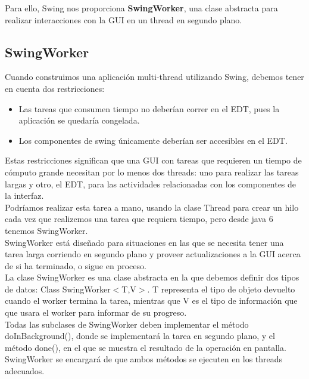 \documentclass[12pt, a4paper]{book}
\begin{document}
Para ello, Swing nos proporciona \textbf{SwingWorker}, una clase abstracta para realizar interacciones con la \gls{GUI} en un thread en segundo plano.

\subsection{SwingWorker}

Cuando construimos una aplicación multi-thread utilizando Swing, debemos tener en cuenta dos restricciones:

\begin{itemize}
	\item Las tareas que consumen tiempo no deberían correr en el \gls{EDT}, pues la aplicación se quedaría congelada.
	\item Los componentes de swing únicamente deberían ser accesibles en el \gls{EDT}.
\end{itemize}

Estas restricciones significan que una \gls{GUI} con tareas que requieren un tiempo de cómputo grande necesitan por lo menos dos threads: uno para realizar las tareas largas y otro, el \gls{EDT}, para las actividades relacionadas con los componentes de la interfaz.\\

Podríamos realizar esta tarea a mano, usando la clase Thread para crear un hilo cada vez que realizemos una tarea que requiera tiempo, pero desde java 6 tenemos SwingWorker.\\

SwingWorker está diseñado para situaciones en las que se necesita tener una tarea larga corriendo en segundo plano y proveer actualizaciones a la \gls{GUI} acerca de si ha terminado, o sigue en proceso.\\

La clase SwingWorker es una clase abstracta en la que debemos definir dos tipos de datos: Class SwingWorker$<$T,V$>$. T representa el tipo de objeto devuelto cuando el worker termina la tarea, mientras que V es el tipo de información que que usara el worker para informar de su progreso.\\

Todas las subclases de SwingWorker deben implementar el método doInBackground(), donde se implementará la tarea en segundo plano, y el método done(), en el que se muestra el resultado de la operación en pantalla. SwingWorker se encargará de que ambos métodos se ejecuten en los threads adecuados.\\
\end{document}
